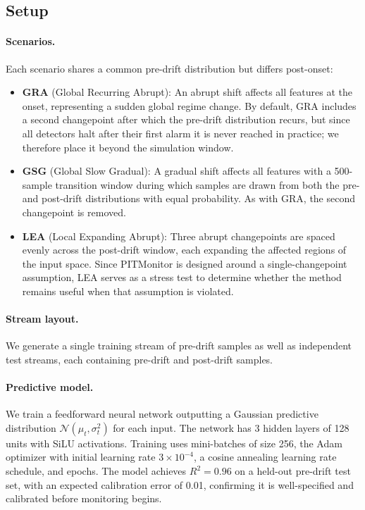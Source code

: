 \documentclass[ejsv2, noshowframe]{imsart}
\theoremstyle{plain}
\theoremstyle{definition}
\theoremstyle{remark}
\begin{document}
\subsection{Setup}

\paragraph{Scenarios.}
Each scenario shares a common pre-drift distribution but differs post-onset:
\begin{itemize}
 \item \textbf{GRA} (Global Recurring Abrupt): An abrupt shift affects all features at the onset, representing a sudden global regime change. By default, GRA includes a second changepoint after which the pre-drift distribution recurs, but since all detectors halt after their first alarm it is never reached in practice; we therefore place it beyond the simulation window.
 \item \textbf{GSG} (Global Slow Gradual): A gradual shift affects all features with a 500-sample transition window during which samples are drawn from both the pre- and post-drift distributions with equal probability. As with GRA, the second changepoint is removed.
 \item \textbf{LEA} (Local Expanding Abrupt): Three abrupt changepoints are spaced evenly across the post-drift window, each expanding the affected regions of the input space. Since PITMonitor is designed around a single-changepoint assumption, LEA serves as a stress test to determine whether the method remains useful when that assumption is violated.
\end{itemize}

\paragraph{Stream layout.}
We generate a single training stream of \expNtrain{} pre-drift samples as well as \expNtrials{} independent test streams, each containing \expNstable{} pre-drift and \expNpost{} post-drift samples.

\paragraph{Predictive model.}
We train a feedforward neural network outputting a Gaussian predictive distribution $\mathcal{N}(\mu_t, \sigma_t^2)$ for each input. The network has 3 hidden layers of 128 units with SiLU activations. Training uses mini-batches of size 256, the Adam optimizer with initial learning rate $3 \times 10^{-4}$, a cosine annealing learning rate schedule, and \expEpochs{} epochs. The model achieves $R^2 = 0.96$ on a held-out pre-drift test set, with an expected calibration error of 0.01, confirming it is well-specified and calibrated before monitoring begins.
\end{document}
